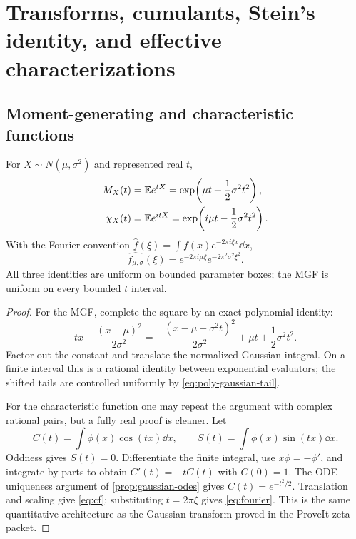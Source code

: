 \section{Transforms, cumulants, Stein's identity, and effective characterizations}\label{sec:transforms}

\subsection{Moment-generating and characteristic functions}

\begin{theorem}\label{thm:transforms}
For $X\sim N(\mu,\sigma^2)$ and represented real $t$,
\begin{align}
 M_X(t)&=\mathbb E e^{tX}=\exp\!\left(\mu t+\frac12\sigma^2t^2\right),\label{eq:mgf}\\
 \chi_X(t)&=\mathbb E e^{itX}=\exp\!\left(i\mu t-\frac12\sigma^2t^2\right).
 \label{eq:cf}
\end{align}
With the Fourier convention $\widehat f(\xi)=\int f(x)e^{-2\pi i\xi x}\dd x$,
\begin{equation}\label{eq:fourier}
 \widehat{f_{\mu,\sigma}}(\xi)
 =e^{-2\pi i\mu\xi}e^{-2\pi^2\sigma^2\xi^2}.
\end{equation}
All three identities are uniform on bounded parameter boxes; the MGF is uniform on every bounded $t$ interval.
\end{theorem}

\begin{proof}
For the MGF, complete the square by an exact polynomial identity:
\[
 tx-\frac{(x-\mu)^2}{2\sigma^2}
 =-\frac{(x-\mu-\sigma^2t)^2}{2\sigma^2}
   +\mu t+\frac12\sigma^2t^2.
\]
Factor out the constant and translate the normalized Gaussian integral.  On a finite interval this is a rational identity between exponential evaluators; the shifted tails are controlled uniformly by \eqref{eq:poly-gaussian-tail}.

For the characteristic function one may repeat the argument with complex rational pairs, but a fully real proof is cleaner.  Let
\[
 C(t)=\int\phi(x)\cos(tx)\dd x,\qquad
 S(t)=\int\phi(x)\sin(tx)\dd x.
\]
Oddness gives $S(t)=0$.  Differentiate the finite integral, use $x\phi=-\phi'$, and integrate by parts to obtain $C'(t)=-tC(t)$ with $C(0)=1$.  The ODE uniqueness argument of \cref{prop:gaussian-odes} gives $C(t)=e^{-t^2/2}$.  Translation and scaling give \eqref{eq:cf}; substituting $t=2\pi\xi$ gives \eqref{eq:fourier}.  This is the same quantitative architecture as the Gaussian transform proved in the ProveIt zeta packet.
\end{proof}

